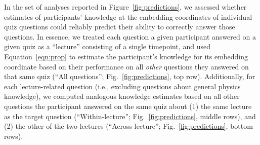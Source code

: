 \documentclass[10pt]{article}
\begin{document}
In the set of analyses reported in Figure~\ref{fig:predictions}, we assessed whether estimates of participants' knowledge at the embedding coordinates of individual quiz questions could reliably predict their ability to correctly answer those questions.
In essence, we treated each question a given participant answered on a given quiz as a ``lecture'' consisting of a single timepoint, and used Equation~\ref{eqn:prop} to estimate the participant's knowledge for its embedding coordinate based on their performance on all \textit{other} questions they answered on that same quiz (``All questions''; Fig.~\ref{fig:predictions}, top row). 
Additionally, for each lecture-related question (i.e., excluding questions about general physics knowledge), we computed analogous knowledge estimates based on all other questions the participant answered on the same quiz about (1) the same lecture as the target question (``Within-lecture''; Fig.~\ref{fig:predictions}, middle rows), and (2) the other of the two lectures (``Across-lecture''; Fig.~\ref{fig:predictions}, bottom rows).
\end{document}
